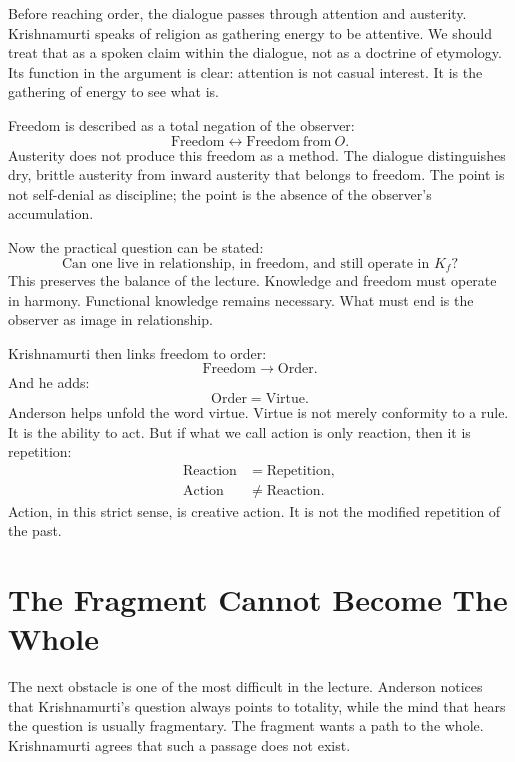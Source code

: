 Before reaching order, the dialogue passes through attention and austerity. Krishnamurti speaks of religion as gathering energy to be attentive. We should treat that as a spoken claim within the dialogue, not as a doctrine of etymology. Its function in the argument is clear: attention is not casual interest. It is the gathering of energy to see what is.

Freedom is described as a total negation of the observer:
\begin{equation}
\mathrm{Freedom}
\longleftrightarrow
\mathrm{Freedom\ from\ } O.
\end{equation}
Austerity does not produce this freedom as a method. The dialogue distinguishes dry, brittle austerity from inward austerity that belongs to freedom. The point is not self-denial as discipline; the point is the absence of the observer's accumulation.

Now the practical question can be stated:
\begin{equation}
\text{Can one live in relationship, in freedom, and still operate in } K_f?
\end{equation}
This preserves the balance of the lecture. Knowledge and freedom must operate in harmony. Functional knowledge remains necessary. What must end is the observer as image in relationship.

Krishnamurti then links freedom to order:
\begin{equation}
\mathrm{Freedom}
\longrightarrow
\mathrm{Order}.
\end{equation}
And he adds:
\begin{equation}
\mathrm{Order}=\mathrm{Virtue}.
\end{equation}
Anderson helps unfold the word virtue. Virtue is not merely conformity to a rule. It is the ability to act. But if what we call action is only reaction, then it is repetition:
\begin{align}
\mathrm{Reaction} &= \mathrm{Repetition},\\
\mathrm{Action} &\neq \mathrm{Reaction}.
\end{align}
Action, in this strict sense, is creative action. It is not the modified repetition of the past.

\section{The Fragment Cannot Become The Whole}

The next obstacle is one of the most difficult in the lecture. Anderson notices that Krishnamurti's question always points to totality, while the mind that hears the question is usually fragmentary. The fragment wants a path to the whole. Krishnamurti agrees that such a passage does not exist.

